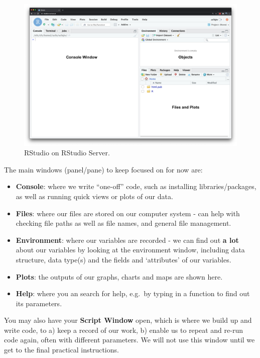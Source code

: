\documentclass[
]{book}
\providecommand{\tightlist}{%
  \setlength{\itemsep}{0pt}\setlength{\parskip}{0pt}}
\begin{document}
\begin{figure}

{\centering \includegraphics[width=0.9\linewidth]{images/w04/rstudio_interface} 

}

\caption{RStudio on RStudio Server.}\label{fig:04-rstudio-interface-script}
\end{figure}

The main windows (panel/pane) to keep focused on for now are:

\begin{itemize}
\tightlist
\item
  \textbf{Console}: where we write ``one-off'' code, such as installing libraries/packages, as well as running quick views or plots of our data.
\item
  \textbf{Files}: where our files are stored on our computer system - can help with checking file paths as well as file names, and general file management.
\item
  \textbf{Environment}: where our variables are recorded - we can find out \textbf{a lot} about our variables by looking at the environment window, including data structure, data type(s) and the fields and `attributes' of our variables.
\item
  \textbf{Plots}: the outputs of our graphs, charts and maps are shown here.
\item
  \textbf{Help}: where you an search for help, e.g.~by typing in a function to find out its parameters.
\end{itemize}

You may also have your \textbf{Script Window} open, which is where we build up and write code, to a) keep a record of our work, b) enable us to repeat and re-run code again, often with different parameters. We will not use this window until we get to the final practical instructions.
\end{document}

